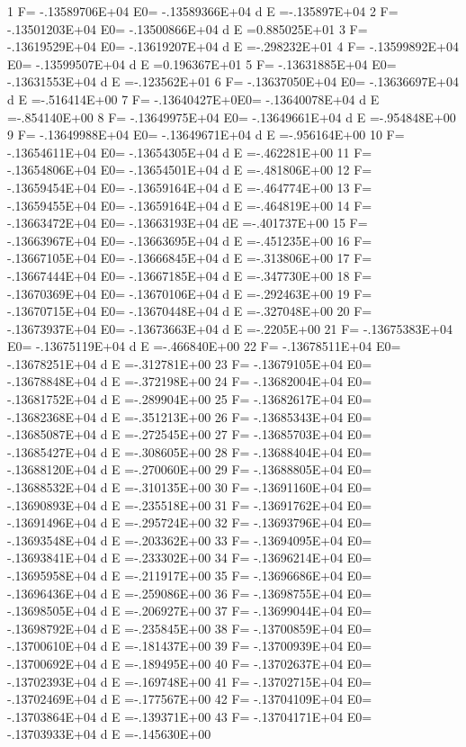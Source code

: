    1 F= -.13589706E+04 E0= -.13589366E+04  d E =-.135897E+04
   2 F= -.13501203E+04 E0= -.13500866E+04  d E =0.885025E+01
   3 F= -.13619529E+04 E0= -.13619207E+04  d E =-.298232E+01
   4 F= -.13599892E+04 E0= -.13599507E+04  d E =0.196367E+01
   5 F= -.13631885E+04 E0= -.13631553E+04  d E =-.123562E+01
   6 F= -.13637050E+04 E0= -.13636697E+04  d E =-.516414E+00
   7 F= -.13640427E+0E0= -.13640078E+04  d E =-.854140E+00
   8 F= -.13649975E+04 E0= -.13649661E+04  d E =-.954848E+00
   9 F= -.13649988E+04 E0= -.13649671E+04  d E =-.956164E+00
  10 F= -.13654611E+04 E0= -.13654305E+04  d E =-.462281E+00
  11 F= -.13654806E+04 E0= -.13654501E+04  d E =-.481806E+00
  12 F= -.13659454E+04 E0= -.13659164E+04  d E =-.464774E+00
  13 F= -.13659455E+04 E0= -.13659164E+04  d E =-.464819E+00
  14 F= -.13663472E+04 E0= -.13663193E+04  dE =-.401737E+00
  15 F= -.13663967E+04 E0= -.13663695E+04  d E =-.451235E+00
  16 F= -.13667105E+04 E0= -.13666845E+04  d E =-.313806E+00
  17 F= -.13667444E+04 E0= -.13667185E+04  d E =-.347730E+00
  18 F= -.13670369E+04 E0= -.13670106E+04  d E =-.292463E+00
  19 F= -.13670715E+04 E0= -.13670448E+04  d E =-.327048E+00
  20 F= -.13673937E+04 E0= -.13673663E+04  d E =-.2205E+00
  21 F= -.13675383E+04 E0= -.13675119E+04  d E =-.466840E+00
  22 F= -.13678511E+04 E0= -.13678251E+04  d E =-.312781E+00
  23 F= -.13679105E+04 E0= -.13678848E+04  d E =-.372198E+00
  24 F= -.13682004E+04 E0= -.13681752E+04  d E =-.289904E+00
  25 F= -.13682617E+04 E0= -.13682368E+04  d E =-.351213E+00
  26 F= -.13685343E+04 E0= -.13685087E+04  d E =-.272545E+00
  27 F= -.13685703E+04 E0= -.13685427E+04  d E =-.308605E+00
  28 F= -.13688404E+04 E0= -.13688120E+04  d E =-.270060E+00
  29 F= -.13688805E+04 E0= -.13688532E+04  d E =-.310135E+00
  30 F= -.13691160E+04 E0= -.13690893E+04  d E =-.235518E+00
  31 F= -.13691762E+04 E0= -.13691496E+04  d E =-.295724E+00
  32 F= -.13693796E+04 E0= -.13693548E+04  d E =-.203362E+00
  33 F= -.13694095E+04 E0= -.13693841E+04  d E =-.233302E+00
  34 F= -.13696214E+04 E0= -.13695958E+04  d E =-.211917E+00
  35 F= -.13696686E+04 E0= -.13696436E+04  d E =-.259086E+00
  36 F= -.13698755E+04 E0= -.13698505E+04  d E =-.206927E+00
  37 F= -.13699044E+04 E0= -.13698792E+04  d E =-.235845E+00
  38 F= -.13700859E+04 E0= -.13700610E+04  d E =-.181437E+00
  39 F= -.13700939E+04 E0= -.13700692E+04  d E =-.189495E+00
  40 F= -.13702637E+04 E0= -.13702393E+04  d E =-.169748E+00
  41 F= -.13702715E+04 E0= -.13702469E+04  d E =-.177567E+00
  42 F= -.13704109E+04 E0= -.13703864E+04  d E =-.139371E+00
  43 F= -.13704171E+04 E0= -.13703933E+04  d E =-.145630E+00
